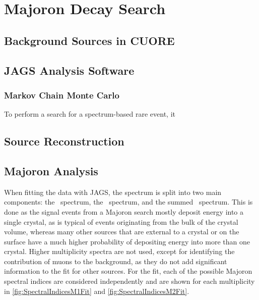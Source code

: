 \chapter{Majoron Decay Search}

\section{Background Sources in CUORE}

\section{JAGS Analysis Software}
\subsection{Markov Chain Monte Carlo}
To perform a search for a spectrum-based rare event, it 
\section{Source Reconstruction}

\section{Majoron Analysis}
When fitting the data with JAGS, the spectrum is split into two main components: the \Mone~spectrum, the \Mtwo~spectrum, and the summed \Msum~spectrum. This is done as the signal events from a Majoron search mostly deposit energy into a single crystal, as is typical of events originating from the bulk of the crystal volume, whereas many other sources that are external to a crystal or on the surface have a much higher probability of depositing energy into more than one crystal. Higher multiplicity spectra are not used, except for identifying the contribution of muons to the background, as they do not add significant information to the fit for other sources. For the fit, each of the possible Majoron spectral indices are considered independently and are shown for each multiplicity in \autoref{fig:SpectralIndicesM1Fit} and \autoref{fig:SpectralIndicesM2Fit}.


